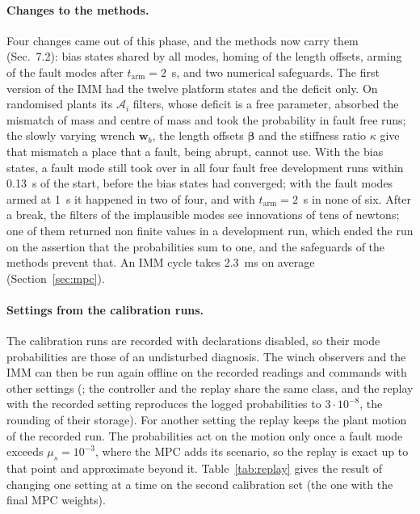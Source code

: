 \documentclass[10pt]{article}
\newcommand{\vc}[1]{\bm{#1}}
\begin{document}
\paragraph{Changes to the methods.} Four changes came out of this phase, and the methods now carry them (Sec.~7.2): bias states shared by all modes, homing of the length offsets, arming of the fault modes after $t_{\mathrm{arm}}=2$~s, and two numerical safeguards. The first version of the IMM had the twelve platform states and the deficit only. On randomised plants its $\mathcal A_i$ filters, whose deficit is a free parameter, absorbed the mismatch of mass and centre of mass and took the probability in fault free runs; the slowly varying wrench $\vc w_b$, the length offsets $\vc\beta$ and the stiffness ratio $\kappa$ give that mismatch a place that a fault, being abrupt, cannot use. With the bias states, a fault mode still took over in all four fault free development runs within 0.13~s of the start, before the bias states had converged; with the fault modes armed at 1~s it happened in two of four, and with $t_{\mathrm{arm}}=2$~s in none of six. After a break, the filters of the implausible modes see innovations of tens of newtons; one of them returned non finite values in a development run, which ended the run on the assertion that the probabilities sum to one, and the safeguards of the methods prevent that. An IMM cycle takes 2.3~ms on average (Section~\ref{sec:mpc}).

\paragraph{Settings from the calibration runs.} The calibration runs are recorded with declarations disabled, so their mode probabilities are those of an undisturbed diagnosis. The winch observers and the IMM can then be run again offline on the recorded readings and commands with other settings (; the controller and the replay share the same class, and the replay with the recorded setting reproduces the logged probabilities to $3\cdot10^{-8}$, the rounding of their storage). For another setting the replay keeps the plant motion of the recorded run. The probabilities act on the motion only once a fault mode exceeds $\mu_s=10^{-3}$, where the MPC adds its scenario, so the replay is exact up to that point and approximate beyond it. Table~\ref{tab:replay} gives the result of changing one setting at a time on the second calibration set (the one with the final MPC weights).
\end{document}
